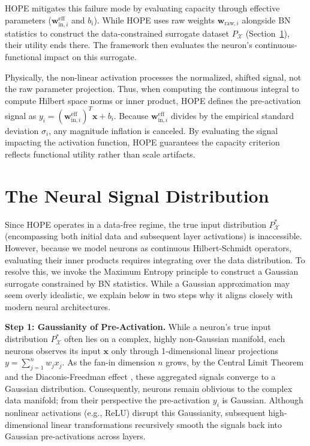 \documentclass[11pt, a4paper, copyright, gdm]{google}
\newcommand{\wVect}{\boldsymbol{w}}
\newcommand{\xVect}{\boldsymbol{x}}
\newcommand{\calX}{\mathcal{X}}
\theoremstyle{definition}
\begin{document}
HOPE mitigates this failure mode by evaluating capacity through effective parameters ($\wVect_{\text{in},i}^{\text{eff}}$ and $b_i$). While HOPE uses raw weights $\wVect_{\text{raw},i}$ alongside BN statistics to construct the data-constrained surrogate dataset $P_{\calX}$ (Section~\ref{sec:neural_signal_distribution}), their utility ends there. The framework then evaluates the neuron's continuous-functional impact on this surrogate.

Physically, the non-linear activation processes the normalized, shifted signal, not the raw parameter projection. Thus, when computing the continuous integral to compute Hilbert space norms or inner product, HOPE defines the pre-activation signal as $y_i = (\wVect_{\text{in},i}^{\text{eff}})^T \xVect + b_i$. Because $\wVect_{\text{in},i}^{\text{eff}}$ divides by the empirical standard deviation $\sigma_i$, any magnitude inflation is canceled. By evaluating the signal impacting the activation function, HOPE guarantees the capacity criterion reflects functional utility rather than scale artifacts.

\section{The Neural Signal Distribution}
\label{sec:neural_signal_distribution}
Since HOPE operates in a data-free regime, the true input distribution $P^*_{\calX}$ (encompassing both initial data and subsequent layer activations) is inaccessible. However, because we model neurons as continuous Hilbert-Schmidt operators, evaluating their inner products requires integrating over the data distribution. To resolve this, we invoke the Maximum Entropy principle \cite{jaynes1957information} to construct a Gaussian surrogate constrained by BN statistics. While a Gaussian approximation may seem overly idealistic, we explain below in two steps why it aligns closely with modern neural architectures.

\noindent \textbf{Step 1: Gaussianity of Pre-Activation.} While a neuron's true input distribution $P^*_{\calX}$ often lies on a complex, highly non-Gaussian manifold, each neurons observes its input $\xVect$ only through 1-dimensional linear projections $y = \sum_{j=1}^{n} w_j x_j$. As the fan-in dimension $n$ grows, by the Central Limit Theorem and the Diaconis-Freedman effect \cite{diaconis1984asymptotics}, these aggregated signals converge to a Gaussian distribution. Consequently, neurons remain oblivious to the complex data manifold; from their perspective the pre-activation $y_i$ is Gaussian. Although nonlinear activations (e.g., ReLU) disrupt this Gaussianity, subsequent high-dimensional linear transformations recursively smooth the signals back into Gaussian pre-activations across layers.
\end{document}
